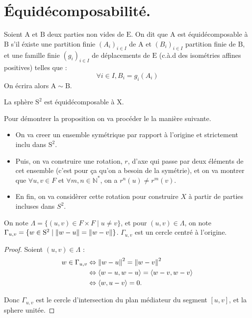 \section{Équidécomposabilité.}\label{ed}
\noindent
Soient $\mathrm{A}$ et $\mathrm{B}$ deux parties non vides de  $\mathrm{E}$. On dit que $\mathrm{A}$ est équidécomposable à $\mathrm{B}$ s'il éxiste une partition finie $(A_i)_{i\in I}$ de $\mathrm{A}$ et $(B_i)_{i\in I}$ partition finie de $\mathrm{B}$, et une famille finie $(g_i)_{i\in I}$ de déplacements de $\mathrm{E}$ (c.à.d des isométries affines positives) telles que :$$\forall i \in I, B_i = g_i(A_i)$$
On écrira alors $\mathrm{A} \sim \mathrm{B}$.\par
\begin{prop}\label{prop8}
  La sphère $\mathrm{S}^2$ est équidécomposable à $\mathrm{X}$.
\end{prop}
\noindent
Pour démontrer la proposition on va procéder le la manière suivante.
\begin{itemize}
  \item On va creer un ensemble symétrique par rapport à l'origine et strictement inclu dans $\mathrm{S}^2$.
  \item Puis, on va construire une rotation, $r$, d'axe qui passe par deux éléments de cet ensemble (c'est pour ça qu'on a besoin de la symétrie), et on va montrer que $\forall u,v \in F$ et $\forall m,n \in \mathbb{N}^*$, on a $r^n(u) \ne r^m(v)$.
  \item En fin, on va considèrer cette rotation pour construire $X$ à partir de parties incluses dans $S^2$.
\end{itemize}
\begin{lemma}\label{lemme15}
  \hfill

  On note $\Lambda = \{ (u, v) \in F\times F \mid u\neq v\}$, et pour $(u, v) \in \Lambda$, on note $\Gamma_{u, v} = \{ w \in \mathrm{S}^2 \mid \left\lVert w-u \right\rVert = \left\lVert w-v \right\rVert\}$. $\Gamma_{u, v}$ est un cercle centré à l'origine.
\end{lemma}
\begin{proof}
  \hfill

  Soient $(u, v) \in \Lambda$ :
  \begin{align*}
    w \in \Gamma_{u, v} &\Leftrightarrow \left\lVert w-u \right\rVert^2 = \left\lVert w-v \right\rVert^2\\
    &\Leftrightarrow  \langle w-u, w-u \rangle = \langle w-v, w-v \rangle\\
    &\Leftrightarrow \langle w, u-v \rangle = 0.
  \end{align*}\par
  Donc $\Gamma_{u, v}$ est le cercle d'intersection du plan médiateur du segment $[u, v]$, et la sphere unitée.
\end{proof}
